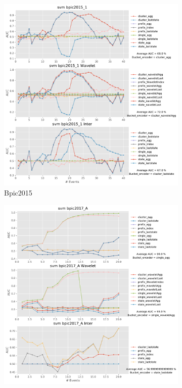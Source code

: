 \documentclass[twoside,11pt]{Latex/Classes/PhDthesisPSnPDF}
\begin{document}
\begin{figure}[!htbp]
\begin{subfigure}{0.48\textwidth}
		\includegraphics[width=\linewidth]{images/inter/svm/bpic2015_1.pdf}
		\caption{Bpic2015} \label{fig:b151i}
	\end{subfigure}	
	\begin{subfigure}{0.48\textwidth}
		\includegraphics[width=\linewidth]{images/inter/svm/bpic2017_A.pdf}

\end{subfigure}
\end{figure}
\end{document}
